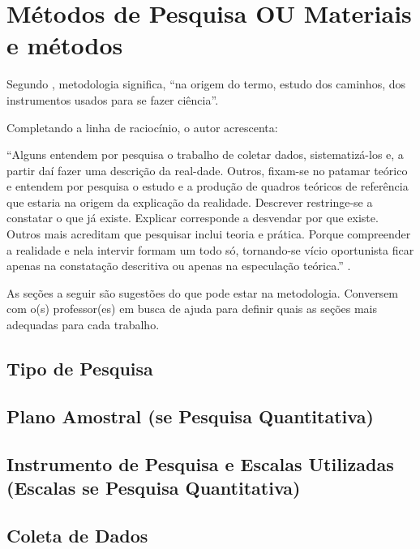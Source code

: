 \documentclass[
	article,			%
	12pt,				%
	oneside,			%
	a4paper,			%
	english,			%
	brazil,				%
	sumario=tradicional
	]{abntex2}
\begin{document}
\section{Métodos de Pesquisa OU Materiais e métodos}

Segundo , metodologia significa, “na origem do termo, estudo dos caminhos, dos instrumentos usados para se fazer ciência”.

Completando a linha de raciocínio, o autor acrescenta:

    \begin{citacao}
    “Alguns entendem por pesquisa o trabalho de coletar dados, sistematizá-los e, a partir daí fazer uma descrição da real-dade. Outros, fixam-se no patamar teórico e entendem por pesquisa o estudo e a produção de quadros teóricos de referência que estaria na origem da explicação da realidade. Descrever restringe-se a constatar o que já existe. Explicar corresponde a desvendar por que existe. Outros mais acreditam que pesquisar inclui teoria e prática. Porque compreender a realidade e nela intervir formam um todo só, tornando-se vício oportunista ficar apenas na constatação descritiva ou apenas na especulação teórica.”
    \lipsum[5] \cite{PESQUISA:DEMO}.
    \end{citacao}



As seções a seguir são sugestões do que pode estar na metodologia. Conversem com o(s) professor(es) em busca de ajuda para definir quais as seções mais adequadas para cada trabalho.

\subsection{Tipo de Pesquisa}
\lipsum[1]

\subsection{Plano Amostral (se Pesquisa Quantitativa)}
\lipsum[1]

\subsection{Instrumento de Pesquisa e Escalas Utilizadas (Escalas se Pesquisa Quantitativa)}
\lipsum[1]

\subsection{Coleta de Dados}
\lipsum[1]
\end{document}

